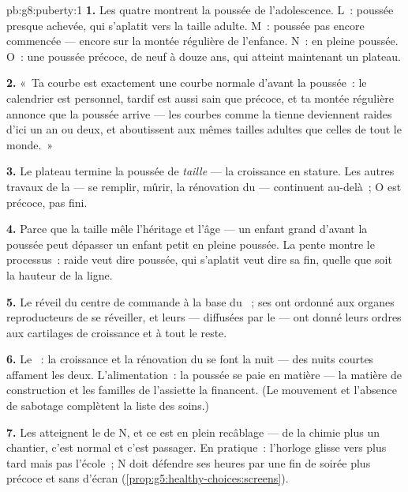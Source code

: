 \begin{solution}{pb:g8:puberty:1}
\textbf{1.} Les quatre montrent la poussée de l'adolescence. L~:
poussée presque achevée, qui s'aplatit vers la taille adulte. M~:
poussée pas encore commencée --- encore sur la montée régulière de
l'enfance. N~: en pleine poussée. O~: une poussée précoce, de neuf à
douze ans, qui atteint maintenant un plateau.

\textbf{2.} «~Ta courbe est exactement une courbe normale d'avant la
poussée~: le calendrier est personnel, tardif est aussi sain que
précoce, et ta montée régulière annonce que la poussée arrive ---
les courbes comme la tienne deviennent raides d'ici un an ou deux,
et aboutissent aux mêmes tailles adultes que celles de tout le
monde.~»

\textbf{3.} Le plateau termine la poussée de \emph{taille} --- la
croissance en stature. Les autres travaux de la  --- se
remplir, mûrir, la rénovation du  --- continuent au-delà~; O
est précoce, pas fini.

\textbf{4.} Parce que la taille mêle l'héritage et l'âge --- un
enfant grand d'avant la poussée peut dépasser un enfant petit en
pleine poussée. La pente montre le processus~: raide veut dire
poussée, qui s'aplatit veut dire sa fin, quelle que soit la hauteur
de la ligne.

\textbf{5.} Le réveil du centre de commande à la base du ~;
ses  ont ordonné aux organes reproducteurs de se réveiller,
et leurs  --- diffusées par le  --- ont donné leurs
ordres aux cartilages de croissance et à tout le reste.

\textbf{6.} Le ~: la croissance et la rénovation du 
se font la nuit --- des nuits courtes affament les deux.
L'alimentation~: la poussée se paie en matière --- la matière de
construction et les familles de l'assiette la financent. (Le
mouvement et l'absence de sabotage complètent la liste des soins.)

\textbf{7.} Les  atteignent le  de N, et ce 
est en plein recâblage --- de la chimie plus un chantier, c'est
normal et c'est passager. En pratique~: l'horloge glisse vers plus
tard mais pas l'école~; N doit défendre ses heures par une fin de
soirée plus précoce et sans  d'écran
(\cref{prop:g5:healthy-choices:screens}).


\end{solution}
